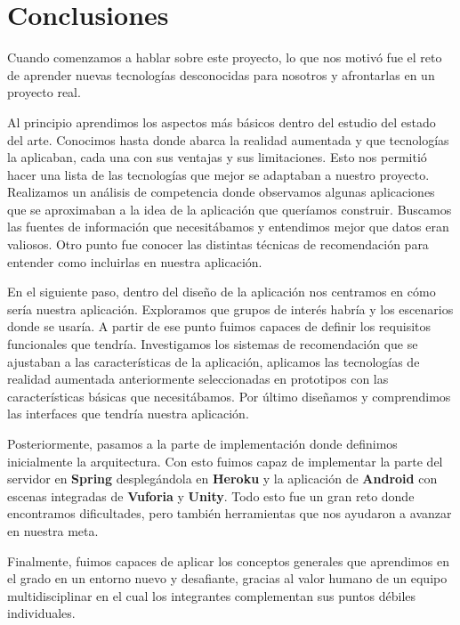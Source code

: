 
\cleardoublepage


\chapter{Conclusiones}
\label{makereference5}
Cuando comenzamos a hablar sobre este proyecto, lo que nos motivó fue el
 reto de aprender nuevas tecnologías desconocidas para nosotros y afrontarlas
 en un proyecto real.  

Al principio aprendimos los aspectos más básicos dentro del estudio del
 estado del arte. Conocimos hasta donde abarca la realidad aumentada
  y que tecnologías la aplicaban, cada una con sus ventajas y sus
 limitaciones. Esto nos permitió hacer una lista de las tecnologías
 que mejor se adaptaban a nuestro proyecto. Realizamos un análisis de
 competencia donde observamos algunas aplicaciones que se aproximaban a la
 idea de la aplicación que queríamos construir. Buscamos las fuentes de
 información que necesitábamos y entendimos mejor que datos eran valiosos.
 Otro punto fue conocer las distintas técnicas de recomendación para entender como incluirlas en nuestra aplicación. 

En el siguiente paso, dentro del diseño de la aplicación nos centramos en
 cómo sería nuestra aplicación. Exploramos que grupos de interés habría y
 los escenarios donde se usaría. A partir de ese punto fuimos capaces de
 definir los requisitos funcionales que tendría. Investigamos los sistemas
 de recomendación que se ajustaban a las características de la aplicación,
 aplicamos las tecnologías de realidad aumentada anteriormente
 seleccionadas en prototipos con las características básicas que
 necesitábamos. Por último diseñamos y comprendimos las interfaces que
 tendría nuestra aplicación. 

Posteriormente, pasamos a la parte de implementación donde definimos
 inicialmente la arquitectura. Con esto fuimos capaz de implementar
 la parte del servidor en \textbf{Spring} desplegándola en \textbf{Heroku}
 y la aplicación de \textbf{Android} con escenas integradas de \textbf{Vuforia} y
 \textbf{Unity}. Todo esto fue un gran reto donde encontramos dificultades,
 pero también herramientas que nos ayudaron a avanzar en nuestra meta. 

Finalmente, fuimos capaces de aplicar los conceptos generales que aprendimos
 en el grado en un entorno nuevo y desafiante, gracias al valor humano de
 un equipo multidisciplinar en el cual los integrantes complementan sus
 puntos débiles individuales. 
